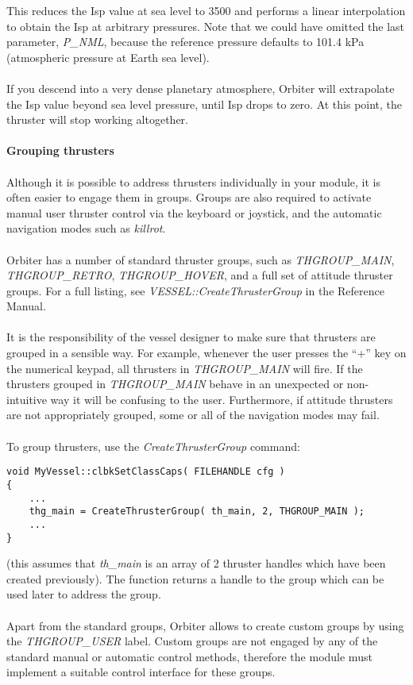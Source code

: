 \documentclass[Orbiter Developer Manual.tex]{subfiles}
\begin{document}
\noindent
This reduces the Isp value at sea level to 3500 and performs a linear interpolation to obtain the Isp at arbitrary pressures. Note that we could have omitted the last parameter, \textit{P\_NML}, because the reference pressure defaults to 101.4 kPa (atmospheric pressure at Earth sea level).\\
\\
If you descend into a very dense planetary atmosphere, Orbiter will extrapolate the Isp value beyond sea level pressure, until Isp drops to zero. At this point, the thruster will stop working altogether.\\
\\
\textbf{Grouping thrusters}\\
\\
Although it is possible to address thrusters individually in your module, it is often easier to engage them in groups. Groups are also required to activate manual user thruster control via the keyboard or joystick, and the automatic navigation modes such as \textit{killrot}.\\
\\
Orbiter has a number of standard thruster groups, such as \textit{THGROUP\_MAIN}, \textit{THGROUP\_RETRO}, \textit{THGROUP\_HOVER}, and a full set of attitude thruster groups. For a full listing, see \textit{VESSEL::CreateThrusterGroup} in the Reference Manual.\\
\\
It is the responsibility of the vessel designer to make sure that thrusters are grouped in a sensible way. For example, whenever the user presses the “+” key on the numerical keypad, all thrusters in \textit{THGROUP\_MAIN} will fire. If the thrusters grouped in \textit{THGROUP\_MAIN} behave in an unexpected or non-intuitive way it will be confusing to the user. Furthermore, if attitude thrusters are not appropriately grouped, some or all of the navigation modes may fail.\\
\\
To group thrusters, use the \textit{CreateThrusterGroup} command:

\begin{lstlisting}
void MyVessel::clbkSetClassCaps( FILEHANDLE cfg )
{
	...
	thg_main = CreateThrusterGroup( th_main, 2, THGROUP_MAIN );
	...
}
\end{lstlisting}

\noindent
(this assumes that \textit{th\_main} is an array of 2 thruster handles which have been created previously). The function returns a handle to the group which can be used later to address the group.\\
\\
Apart from the standard groups, Orbiter allows to create custom groups by using the \textit{THGROUP\_USER} label. Custom groups are not engaged by any of the standard manual or automatic control methods, therefore the module must implement a suitable control interface for these groups.
\end{document}
